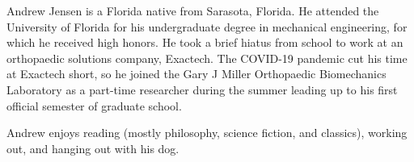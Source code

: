 Andrew Jensen is a Florida native from Sarasota, Florida. He attended the University of Florida for his undergraduate degree in mechanical engineering, for which he received high honors. He took a brief hiatus from school to work at an orthopaedic solutions company, Exactech. The COVID-19 pandemic cut his time at Exactech short, so he joined the Gary J Miller Orthopaedic Biomechanics Laboratory as a part-time researcher during the summer leading up to his first official semester of graduate school.

Andrew enjoys reading (mostly philosophy, science fiction, and classics), working out, and hanging out with his dog.
